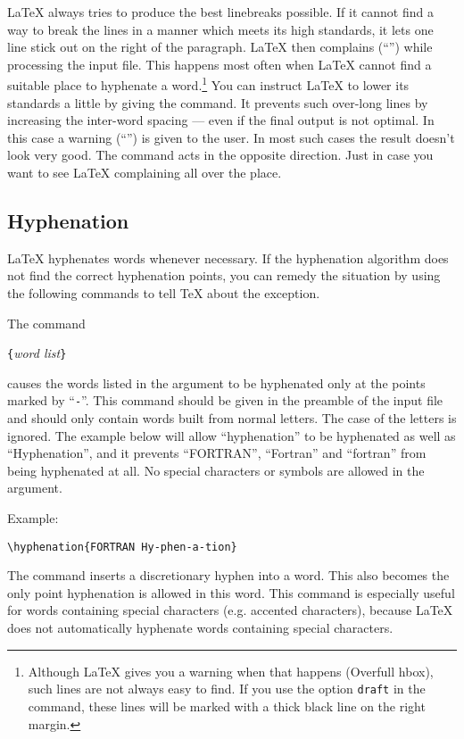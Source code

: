 \LaTeX{} always tries to produce the best linebreaks possible. If it
cannot find a way to break the lines in a manner which meets its high
standards, it lets one line stick out on the right of the paragraph.
\LaTeX{} then complains (``'') while processing the
input file. This happens most often when \LaTeX{} cannot find a
suitable place to hyphenate a word.\footnote{Although \LaTeX{} gives
  you a warning when that happens (Overfull hbox), such lines are not
  always easy to find. If you use the option \texttt{draft} in the
   command, these lines will be marked with a
  thick black line on the right margin.} You can instruct \LaTeX{} to
lower its standards a little by giving the 
command. It prevents such over-long lines by increasing the inter-word
spacing --- even if the final output is not optimal.  In this case a
warning (``'') is given to the user. In most such cases
the result doesn't look very good. The command  acts in the
opposite direction. Just in case you want to see \LaTeX{} complaining
all over the place.

\subsection{Hyphenation} \label{hyph}

\LaTeX{} hyphenates words whenever necessary. If the hyphenation
algorithm does not find the correct hyphenation points, you can
remedy the situation by using the following commands to tell \TeX{}
about the exception.

The command
\begin{command}
\verb|{|\emph{word list}\verb|}|
\end{command}
\noindent causes the words listed in the argument to be hyphenated only at the
points marked by ``\verb|-|''.  This command should be given in the
preamble of the input file and should only contain words built from
normal letters. The case of the letters is ignored. The example below
will allow ``hyphenation'' to be hyphenated as well as ``Hyphenation'',
and it prevents ``FORTRAN'', ``Fortran'' and ``fortran'' from being
hyphenated at all.  No special characters or symbols are allowed in
the argument.

Example:
\begin{code}
\verb|\hyphenation{FORTRAN Hy-phen-a-tion}|
\end{code}

The command \ci{-} inserts a discretionary hyphen into a word. This
also becomes the only point hyphenation is allowed in this word. This
command is especially useful for words containing special characters
(e.g.{} accented characters), because \LaTeX{} does not automatically
hyphenate words containing special characters.

